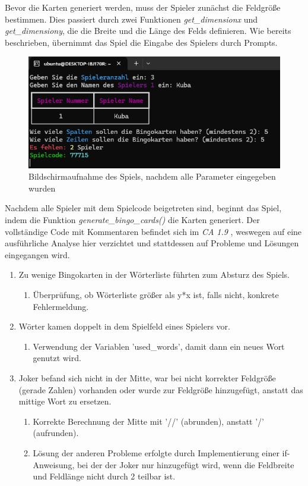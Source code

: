 \documentclass{llncs}
\begin{document}
Bevor die Karten generiert werden, muss der Spieler zunächst die Feldgröße bestimmen. Dies passiert durch zwei Funktionen \textit{get\_dimensionx} und \textit{get\_dimensiony}, die die Breite und die Länge des Felds definieren. Wie bereits beschrieben, übernimmt das Spiel die Eingabe des Spielers durch Prompts.


\begin{figure}
    \centering
    \includegraphics[width=1\linewidth]{Input.png}
    \caption{Bildschirmaufnahme des Spiels, nachdem alle Parameter eingegeben wurden}
    \label{fig:ssGame1}
\end{figure}

Nachdem alle Spieler mit dem Spielcode beigetreten sind, beginnt das Spiel, indem die Funktion \textit{generate\_bingo\_cards()} die Karten generiert. Der vollständige Code mit Kommentaren befindet sich im \textit{CA 1.9} , weswegen auf eine ausführliche Analyse hier verzichtet und stattdessen auf Probleme und Lösungen eingegangen wird.

\begin{enumerate}
\item Zu wenige Bingokarten in der Wörterliste führten zum Absturz des Spiels.
\begin{enumerate}
\item Überprüfung, ob Wörterliste größer als y*x ist, falls nicht, konkrete Fehlermeldung.
\end{enumerate}
\item Wörter kamen doppelt in dem Spielfeld eines Spielers vor.
\begin{enumerate}
\item Verwendung der Variablen 'used\_words', damit dann ein neues Wort genutzt wird.
\end{enumerate}
\item Joker befand sich nicht in der Mitte, war bei nicht korrekter Feldgröße (gerade Zahlen) vorhanden oder wurde zur Feldgröße hinzugefügt, anstatt das mittige Wort zu ersetzen. 
\begin{enumerate}
\item Korrekte Berechnung der Mitte mit '//' (abrunden), anstatt '/' (aufrunden).
\item Lösung der anderen Probleme erfolgte durch Implementierung einer if-Anweisung, bei der der Joker nur hinzugefügt wird, wenn die Feldbreite und Feldlänge nicht durch 2 teilbar ist. 
\end{enumerate}
\end{enumerate}
\end{document}
